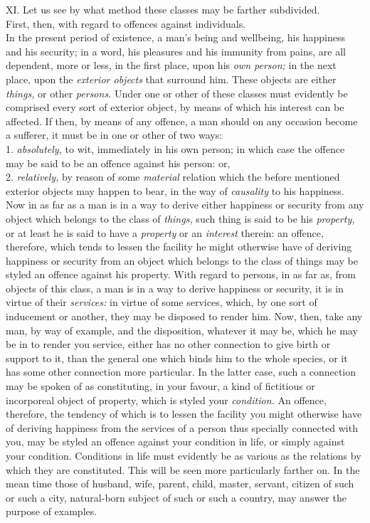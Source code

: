 \documentclass[12pt]{report}
\begin{document}
XI. Let us see by what method these classes may be farther subdivided.\\
First, then, with regard to offences against individuals.\\
In the present period of existence, a man's being and wellbeing, his
happiness and his security; in a word, his pleasures and his immunity
from pains, are all dependent, more or less, in the first place, upon
his \emph{own person;} in the next place, upon the \emph{exterior
objects} that surround him. These objects are either \emph{things,} or
other \emph{persons.} Under one or other of these classes must evidently
be comprised every sort of exterior object, by means of which his
interest can be affected. If then, by means of any offence, a man should
on any occasion become a sufferer, it must be in one or other of two
ways:\\
1. \emph{absolutely,} to wit, immediately in his own person; in which
case the offence may be said to be an offence against his person: or,\\
2. \emph{relatively,} by reason of some \emph{material} relation which
the before mentioned exterior objects may happen to bear, in the way of
\emph{causality} to his happiness.\\
Now in as far as a man is in a way to derive either happiness or
security from any object which belongs to the class of \emph{things,}
such thing is said to be his \emph{property,} or at least he is said to
have a \emph{property} or an \emph{interest} therein: an offence,
therefore, which tends to lessen the facility he might otherwise have of
deriving happiness or security from an object which belongs to the class
of things may be styled an offence against his property. With regard to
persons, in as far as, from objects of this class, a man is in a way to
derive happiness or security, it is in virtue of their \emph{services:}
in virtue of some services, which, by one sort of inducement or another,
they may be disposed to render him. Now, then, take any man, by way of
example, and the disposition, whatever it may be, which he may be in to
render you service, either has no other connection to give birth or
support to it, than the general one which binds him to the whole
species, or it has some other connection more particular. In the latter
case, such a connection may be spoken of as constituting, in your
favour, a kind of fictitious or incorporeal object of property, which is
styled your \emph{condition.} An offence, therefore, the tendency of
which is to lessen the facility you might otherwise have of deriving
happiness from the services of a person thus specially connected with
you, may be styled an offence against your condition in life, or simply
against your condition. Conditions in life must evidently be as various
as the relations by which they are constituted. This will be seen more
particularly farther on. In the mean time those of husband, wife,
parent, child, master, servant, citizen of such or such a city,
natural-born subject of such or such a country, may answer the purpose
of examples.
\end{document}

